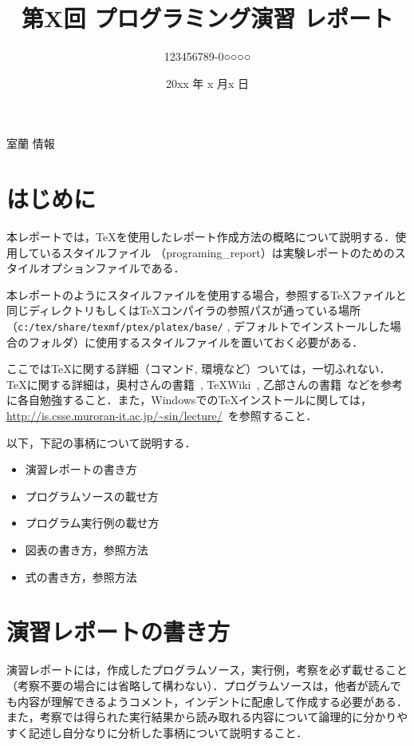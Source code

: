 \documentclass[a4j,titlepage]{jarticle}
\begin{document}

\title{第X回 プログラミング演習 レポート}

\author{123456789-0○○○○}{室蘭 情報}

\date{20xx 年 x 月x 日}
\maketitle


\section{はじめに}

本レポートでは，\TeX を使用したレポート作成方法の概略について説明する．使用しているスタイルファイル
（programing\_\!report）は実験レポートのためのスタイルオプションファイルである．

本レポートのようにスタイルファイルを使用する場合，参照する\TeX ファイルと同じディレクトリもしくは\TeX コンパイラの参照パスが通っている場所（\verb|c:/tex/share/texmf/ptex/platex/base/| , デフォルトでインストールした場合のフォルダ）に使用するスタイルファイルを置いておく必要がある．

ここでは\TeX に関する詳細（コマンド, 環境など）ついては，一切ふれない．\TeX に関する詳細は，奥村さんの書籍~\cite{okumura}, \TeX Wiki~\cite{tex-wiki}, 乙部さんの書籍~\cite{otobe}などを参考に各自勉強すること．また，Windowsでの\TeX インストールに関しては，\url{http://is.csse.muroran-it.ac.jp/~sin/lecture/}~\cite{watanbe-ulr}を参照すること．


以下，下記の事柄について説明する．
\begin{itemize}
\item 演習レポートの書き方
\item プログラムソースの載せ方
\item プログラム実行例の載せ方
\item 図表の書き方，参照方法
\item 式の書き方，参照方法
\end{itemize}

\section{演習レポートの書き方}
演習レポートには，作成したプログラムソース，実行例，考察を必ず載せること（考察不要の場合には省略して構わない）．プログラムソースは，他者が読んでも内容が理解できるようコメント，インデントに配慮して作成する必要がある．また，考察では得られた実行結果から読み取れる内容について論理的に分かりやすく記述し自分なりに分析した事柄について説明すること．
\end{document}
